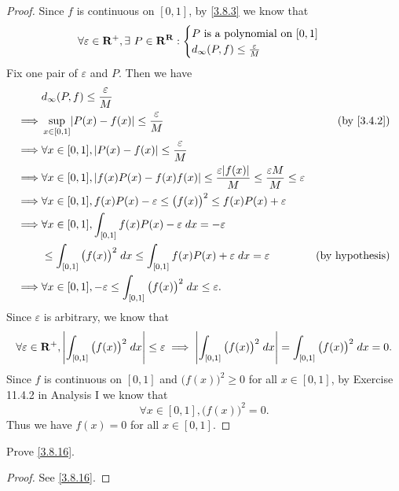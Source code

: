\begin{proof}
  Since \(f\) is continuous on \([0, 1]\), by \cref{3.8.3} we know that
  \[
    \forall \varepsilon \in \mathbf{R}^+, \exists\ P \in \mathbf{R}^{\mathbf{R}} : \begin{cases}
      P \text{ is a polynomial on } [0, 1] \\
      d_{\infty}(P, f) \leq \frac{\varepsilon}{M}
    \end{cases}
  \]
  Fix one pair of \(\varepsilon\) and \(P\).
  Then we have
  \begin{align*}
             & d_\infty(P, f) \leq \frac{\varepsilon}{M}                                                                                                                        \\
    \implies & \sup_{x \in [0, 1]} \abs{P(x) - f(x)} \leq \frac{\varepsilon}{M}                                                                      & \text{(by \cref{3.4.2})} \\
    \implies & \forall x \in [0, 1], \abs{P(x) - f(x)} \leq \frac{\varepsilon}{M}                                                                                               \\
    \implies & \forall x \in [0, 1], \abs{f(x) P(x) - f(x) f(x)} \leq \frac{\varepsilon \abs{f(x)}}{M} \leq \frac{\varepsilon M}{M} \leq \varepsilon                            \\
    \implies & \forall x \in [0, 1], f(x) P(x) - \varepsilon \leq \big(f(x)\big)^2 \leq f(x) P(x) + \varepsilon                                                                 \\
    \implies & \forall x \in [0, 1], \int_{[0, 1]} f(x) P(x) - \varepsilon \; dx = -\varepsilon                                                                                 \\
             & \leq \int_{[0, 1]} \big(f(x)\big)^2 \; dx \leq \int_{[0, 1]} f(x) P(x) + \varepsilon \; dx = \varepsilon                              & \text{(by hypothesis)}   \\
    \implies & \forall x \in [0, 1], -\varepsilon \leq \int_{[0, 1]} \big(f(x)\big)^2 \; dx \leq \varepsilon.
  \end{align*}
  Since \(\varepsilon\) is arbitrary, we know that
  \[
    \forall \varepsilon \in \mathbf{R}^+, \left\lvert\int_{[0, 1]} \big(f(x)\big)^2 \; dx\right\rvert \leq \varepsilon \implies \left\lvert\int_{[0, 1]} \big(f(x)\big)^2 \; dx\right\rvert = \int_{[0, 1]} \big(f(x)\big)^2 \; dx = 0.
  \]
  Since \(f\) is continuous on \([0, 1]\) and \(\big(f(x)\big)^2 \geq 0\) for all \(x \in [0, 1]\), by Exercise 11.4.2 in Analysis I we know that
  \[
    \forall x \in [0, 1], \big(f(x)\big)^2 = 0.
  \]
  Thus we have \(f(x) = 0\) for all \(x \in [0, 1]\).
\end{proof}

\begin{exercise}\label{ex 3.8.9}
  Prove \cref{3.8.16}.
\end{exercise}

\begin{proof}
  See \cref{3.8.16}.
\end{proof}
